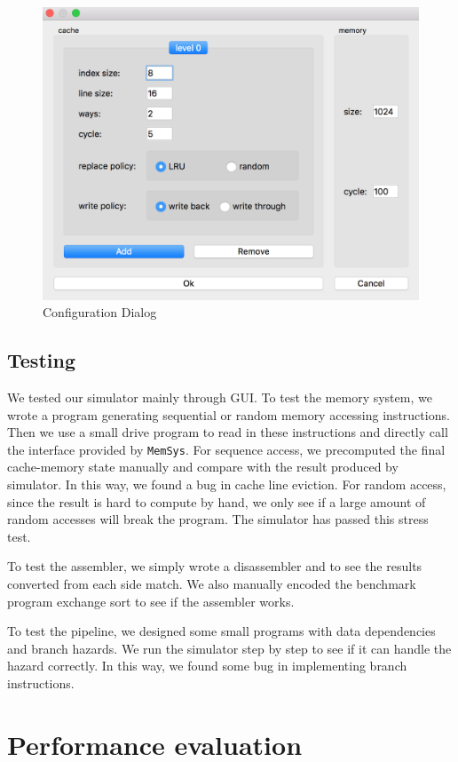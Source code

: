 \documentclass{sig-alternate}
\begin{document}
\begin{figure}
\centering
\includegraphics[width = 0.8\linewidth,keepaspectratio]{config}
\caption{Configuration Dialog}
\label{fig:conf}
\end{figure}

\subsection{Testing}
We tested our simulator mainly through GUI. To test the memory system, we wrote a program generating sequential or random memory accessing instructions. Then we use a small drive program to read in these instructions and directly call the interface provided by \texttt{MemSys}. For sequence access, we precomputed the final cache-memory state manually and compare with the result produced by simulator. In this way, we found a bug in cache line eviction. For random access, since the result is hard to compute by hand, we only see if a large amount of random accesses will break the program. The simulator has passed this stress test.

To test the assembler, we simply wrote a disassembler and to see the results converted from each side match. We also manually encoded the benchmark program exchange sort to see if the assembler works.
 
To test the pipeline, we designed some small programs with data dependencies and branch hazards. We run the simulator step by step to see if it can handle the hazard correctly. In this way, we found some bug in implementing branch instructions.

\section{Performance evaluation}
\end{document}
